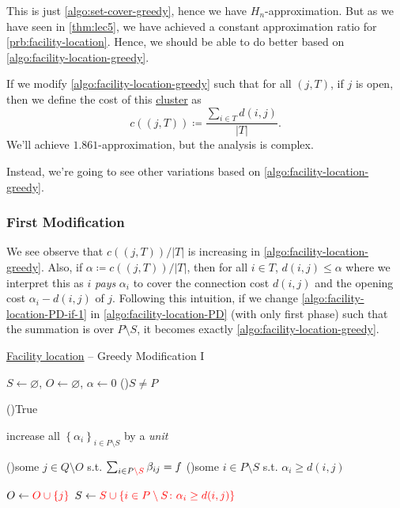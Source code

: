 This is just \autoref{algo:set-cover-greedy}, hence we have \(H_n\)-approximation. But as we have seen in \autoref{thm:lec5}, we have achieved a constant approximation ratio for \autoref{prb:facility-location}. Hence, we should be able to do better based on \autoref{algo:facility-location-greedy}.

\begin{remark}
	If we modify \autoref{algo:facility-location-greedy} such that for all \((j, T)\), if \(j\) is open, then we define the cost of this \hyperref[def:cluster]{cluster} as
	\[
		c((j, T))\coloneqq \frac{\sum_{i\in T} d(i, j)}{\left\vert T \right\vert }.
	\]
	We'll achieve \(1.861\)-approximation, but the analysis is complex.
\end{remark}

Instead, we're going to see other variations based on \autoref{algo:facility-location-greedy}.

\subsubsection{First Modification}
We see observe that \(c((j, T)) / \left\vert T \right\vert \) is increasing in \autoref{algo:facility-location-greedy}. Also, if \(\alpha \coloneqq c((j, T)) / \left\vert T \right\vert\), then for all \(i\in T\), \(d(i, j) \leq \alpha \) where we interpret this as \(i\) \emph{pays} \(\alpha _i\) to cover the connection cost \(d(i, j)\) and the opening cost \(\alpha _i - d(i, j)\) of \(j\). Following this intuition, if we change \autoref{algo:facility-location-PD-if-1} in \autoref{algo:facility-location-PD} (with only first phase) such that the summation is over \(P\setminus S\), it becomes exactly \autoref{algo:facility-location-greedy}.

\begin{algorithm}[H]\label{algo:facility-location-greedy-I}
	\DontPrintSemicolon
	\caption{\hyperref[prb:facility-location]{Facility location} -- Greedy Modification I}
	\BlankLine
	\(S\gets \varnothing \), \(O\gets \varnothing \), \(\alpha \gets 0\) 
	\;
	\While(){\(S \neq P\)}{
	\While(){\textsf{True}}{
	increase all \(\left\{ \alpha _i \right\}_{i\in P\setminus S} \) by a \emph{unit}

	\uIf(){some \(j\in Q\setminus O\) s.t. \(\sum_{i\in P\mathcolor{red}{\setminus S}} \beta _{ij} = f\)}{
		\Break
	}
	\ElseIf(){some \(i\in P\setminus S\) s.t. \(\alpha_i \geq d(i, j)\)}{
		\Break
	}
	}
	\(O\gets \mathcolor{red}{O \cup \left\{ j \right\}}\)
	\(S\gets \mathcolor{red}{S \cup \left\{ i\in P\setminus S\colon \alpha _i \geq d(i, j)\right\} }\)
	}
	\;
\end{algorithm}

